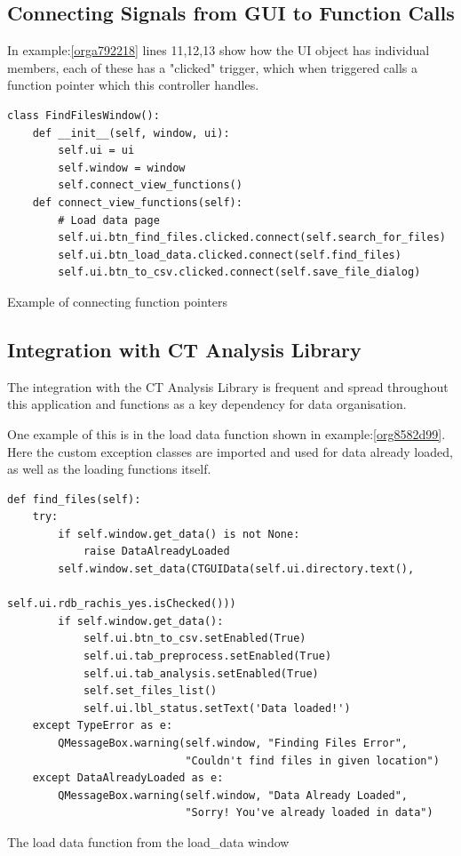 \documentclass[11pt]{report}
\begin{document}
\subsection{Connecting Signals from GUI to Function Calls}
\label{sec:org93393e9}
In example:\ref{orga792218} lines 11,12,13 show how the UI object has individual members, each of these has a "clicked" trigger, which when triggered calls a function pointer which this controller handles.
\begin{listing}[htbp]
\begin{verbatim}
class FindFilesWindow():
    def __init__(self, window, ui):
        self.ui = ui
        self.window = window
        self.connect_view_functions()
    def connect_view_functions(self):
        # Load data page
        self.ui.btn_find_files.clicked.connect(self.search_for_files)
        self.ui.btn_load_data.clicked.connect(self.find_files)
        self.ui.btn_to_csv.clicked.connect(self.save_file_dialog)
\end{verbatim}
\caption{\label{orga792218}
Example of connecting function pointers}
\end{listing}

\subsection{Integration with CT Analysis Library}
\label{sec:orgb50307f}

The integration with the CT Analysis Library is frequent and spread throughout this application and functions as a key dependency for data organisation.

One example of this is in the load data function shown in example:\ref{org8582d99}. Here the custom exception classes are imported and used for data already loaded, as well as the loading functions itself.

\begin{listing}[htbp]
\begin{verbatim}
def find_files(self):
    try:
        if self.window.get_data() is not None:
            raise DataAlreadyLoaded
        self.window.set_data(CTGUIData(self.ui.directory.text(),
                                       self.ui.rdb_rachis_yes.isChecked()))
        if self.window.get_data():
            self.ui.btn_to_csv.setEnabled(True)
            self.ui.tab_preprocess.setEnabled(True)
            self.ui.tab_analysis.setEnabled(True)
            self.set_files_list()
            self.ui.lbl_status.setText('Data loaded!')
    except TypeError as e:
        QMessageBox.warning(self.window, "Finding Files Error",
                            "Couldn't find files in given location")
    except DataAlreadyLoaded as e:
        QMessageBox.warning(self.window, "Data Already Loaded",
                            "Sorry! You've already loaded in data")
\end{verbatim}
\caption{\label{org8582d99}
The load data function from the load\_data window}
\end{listing}
\end{document}
